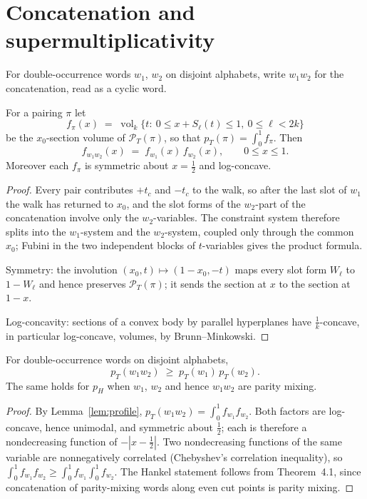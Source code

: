 
\section{Concatenation and supermultiplicativity}

For double-occurrence words $w_1$, $w_2$ on disjoint alphabets, write
$w_1w_2$ for the concatenation, read as a cyclic word.

\begin{lemma}\label{lem:profile}
For a pairing $\pi$ let
\[
f_\pi(x)\;=\;\operatorname{vol}_k\{t:\ 0\le x+S_\ell(t)\le 1,\ 0\le\ell<2k\}
\]
be the $x_0$-section volume of $\mathcal P_T(\pi)$, so that
$p_T(\pi)=\int_0^1 f_\pi$.  Then
\[
f_{w_1w_2}(x)\;=\;f_{w_1}(x)\,f_{w_2}(x),\qquad 0\le x\le1 .
\]
Moreover each $f_\pi$ is symmetric about $x=\tfrac12$ and log-concave.
\end{lemma}

\begin{proof}
Every pair contributes $+t_c$ and $-t_c$ to the walk, so after the last
slot of $w_1$ the walk has returned to $x_0$, and the slot forms of the
$w_2$-part of the concatenation involve only the $w_2$-variables.  The
constraint system therefore splits into the $w_1$-system and the
$w_2$-system, coupled only through the common $x_0$; Fubini in the two
independent blocks of $t$-variables gives the product formula.

Symmetry: the involution $(x_0,t)\mapsto(1-x_0,-t)$ maps every slot form
$W_\ell$ to $1-W_\ell$ and hence preserves $\mathcal P_T(\pi)$; it sends
the section at $x$ to the section at $1-x$.

Log-concavity: sections of a convex body by parallel hyperplanes have
$\frac1k$-concave, in particular log-concave, volumes, by
Brunn--Minkowski.
\end{proof}

\begin{lemma}[Supermultiplicativity]\label{lem:super}
For double-occurrence words on disjoint alphabets,
\[
p_T(w_1w_2)\;\ge\;p_T(w_1)\,p_T(w_2).
\]
The same holds for $p_H$ when $w_1$, $w_2$ and hence $w_1w_2$ are parity
mixing.
\end{lemma}

\begin{proof}
By Lemma~\ref{lem:profile}, $p_T(w_1w_2)=\int_0^1 f_{w_1}f_{w_2}$.  Both
factors are log-concave, hence unimodal, and symmetric about $\tfrac12$;
each is therefore a nondecreasing function of $-|x-\tfrac12|$.  Two
nondecreasing functions of the same variable are nonnegatively correlated
(Chebyshev's correlation inequality), so
$\int_0^1 f_{w_1}f_{w_2}\ge\int_0^1 f_{w_1}\int_0^1 f_{w_2}$.
The Hankel statement follows from Theorem~4.1, since concatenation of
parity-mixing words along even cut points is parity mixing.
\end{proof}

